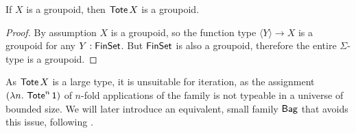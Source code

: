 \documentclass[runningheads]{llncs}
\begin{document}
\begin{proposition}
  If $X$ is a groupoid, then $\operatorname{\mathsf{Tote}} X$ is a groupoid.
\end{proposition}
\begin{proof}
  By assumption $X$ is a groupoid,
  so the function type $\langle Y \rangle → X$ is a groupoid
  for any $Y : \operatorname{\mathsf{FinSet}}$.
  But $\operatorname{\mathsf{FinSet}}$ is also a groupoid, therefore the entire $\Sigma$-type is a groupoid.
\end{proof}

As $\operatorname{\mathsf{Tote}} X$ is a large type, it is unsuitable for iteration, as the assignment $(\lambda n\mathpunct{.}\, \operatorname{\mathsf{Tote}}^n \mathsf{1})$
of $n$-fold applications of the family is not typeable in a universe of bounded size.
We will later introduce an equivalent, small family $\operatorname{\mathsf{Bag}}$ that avoids this issue, following \cite{Finster2021}.

\end{document}
